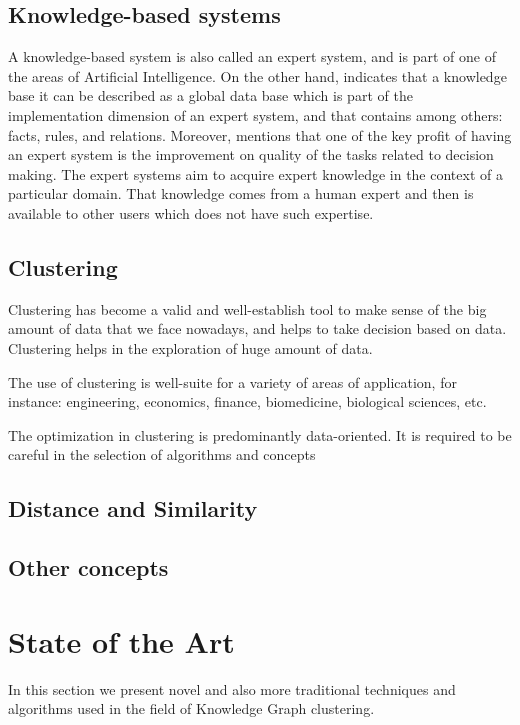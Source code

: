 \documentclass[runningheads]{llncs}
\begin{document}
\subsection{Knowledge-based systems}
A knowledge-based system is also called an expert system, and is part of one of the areas of Artificial Intelligence.\cite{Tripathi}
On the other hand, \cite{Engelmore} indicates that a knowledge base it can be described as a global data base which is part of the implementation dimension of an expert system, and that contains among others: facts, rules, and relations. Moreover, \cite{Engelmore} mentions that one of the key profit of having an expert system is the improvement on quality of the tasks related to decision making.
The expert systems aim to acquire expert knowledge in the context of a particular domain. That knowledge comes from a human expert and then is available to other users which does not have such expertise. \cite{Tripathi}

\subsection{Clustering}
Clustering has become a valid and well-establish tool to make sense of the big amount of data that we face nowadays, and helps to take decision based on data. Clustering helps in the exploration of huge amount of data. \cite{Pedrycz}

The use of clustering is well-suite for a variety of areas of application, for instance: engineering, economics, finance, biomedicine, biological sciences, etc. \cite{Pedrycz}

The optimization in clustering is predominantly data-oriented. \cite{Pedrycz}
It is required to be careful in the selection of algorithms and concepts 

\subsection{Distance and Similarity}

\subsection{Other concepts}

\section{State of the Art}
In this section we present novel and also more traditional techniques and algorithms used in the field of Knowledge Graph clustering. 
\end{document}

